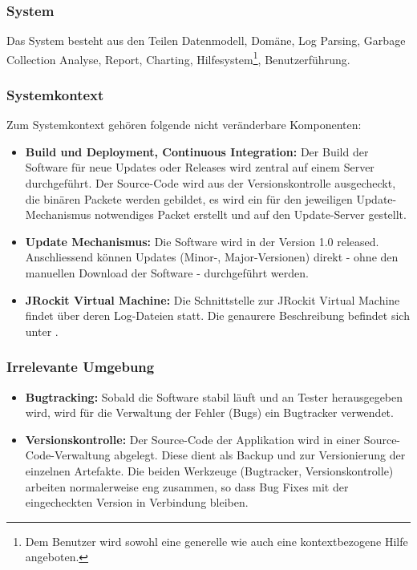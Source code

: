 \subsubsection{System}
Das System besteht aus den Teilen Datenmodell, Domäne, Log Parsing, Garbage Collection Analyse, Report, Charting, Hilfesystem\footnote{Dem Benutzer wird sowohl eine generelle wie auch eine kontextbezogene Hilfe angeboten.}, Benutzerführung.

\subsubsection{Systemkontext}
Zum Systemkontext gehören folgende nicht veränderbare Komponenten:
\begin{itemize}
	\item \textbf{Build und Deployment, Continuous Integration:} Der Build der Software für neue Updates oder Releases wird zentral auf einem Server durchgeführt. Der Source-Code wird aus der Versionskontrolle ausgecheckt, die binären Packete werden gebildet, es wird ein für den jeweiligen Update-Mechanismus notwendiges Packet erstellt und auf den Update-Server gestellt.

	\item \textbf{Update Mechanismus:} Die Software wird in der Version 1.0 released. Anschliessend können Updates (Minor-, Major-Versionen) direkt - ohne den manuellen Download der Software - durchgeführt werden.
	\item \textbf{JRockit Virtual Machine:} Die Schnittstelle zur JRockit Virtual Machine findet über deren Log-Dateien statt. Die genaurere Beschreibung befindet sich unter .
\end{itemize}

\subsubsection{Irrelevante Umgebung}
\begin{itemize}
	\item \textbf{Bugtracking:} Sobald die Software stabil läuft und an Tester herausgegeben wird, wird für die Verwaltung der Fehler (Bugs) ein Bugtracker verwendet.
	\item \textbf{Versionskontrolle:} Der Source-Code der Applikation wird in einer Source-Code-Verwaltung abgelegt. Diese dient als Backup und zur Versionierung der einzelnen Artefakte. Die beiden Werkzeuge (Bugtracker, Versionskontrolle) arbeiten normalerweise eng zusammen, so dass Bug Fixes mit der eingecheckten Version in Verbindung bleiben.
\end{itemize}


